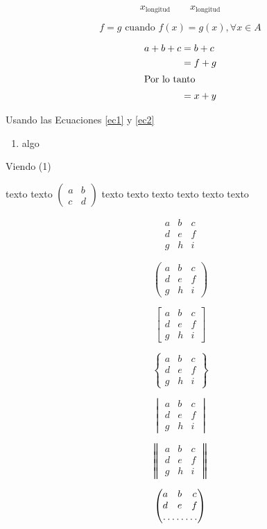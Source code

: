 \documentclass[12pt,a4paper]{report}
\numberwithin{equation}{section}
\begin{document}
$$
x_{\mbox{longitud}}\qquad x_{\text{longitud}}
$$

$$
f=g\text{ cuando }f(x)=g(x),\forall x\in A
$$


\begin{align}
a+b+c & =  b+c \\
& =  f+g \\ \intertext{Por lo tanto}
& =  x+y
\end{align}

Usando las Ecuaciones \eqref{ec1} y \eqref{ec2}

\begin{enumerate}
\item algo	
\end{enumerate}

Viendo (1)


texto texto $(\begin{smallmatrix}a & b \\ c & d\end{smallmatrix})$ texto texto texto texto texto texto


$$
\begin{matrix}
a & b  & c \\
d & e & f \\
g & h & i
\end{matrix}
$$

$$
\begin{pmatrix}
a & b  & c \\
d & e & f \\
g & h & i
\end{pmatrix}
$$

$$
\begin{bmatrix}
a & b  & c \\
d & e & f \\
g & h & i
\end{bmatrix}
$$

$$
\begin{Bmatrix}
a & b  & c \\
d & e & f \\
g & h & i
\end{Bmatrix}
$$

$$
\begin{vmatrix}
a & b  & c \\
d & e & f \\
g & h & i
\end{vmatrix}
$$

$$
\begin{Vmatrix}
a & b  & c \\
d & e & f \\
g & h & i
\end{Vmatrix}
$$

$$
\begin{pmatrix}
a & b  & c \\
d & e & f \\
\hdotsfor{3}
\end{pmatrix}
$$
\end{document}
